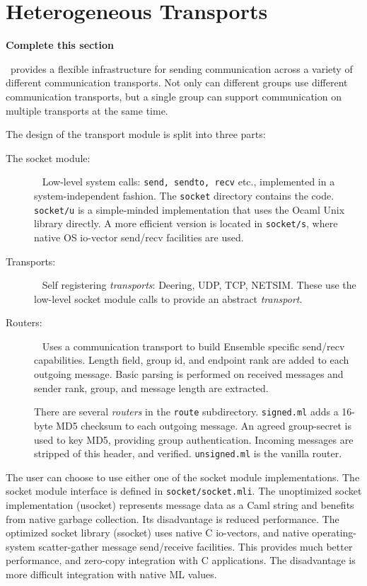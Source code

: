 \newcommand{\sourcefile}[1]    {{\tt {#1}}}


\section{Heterogeneous Transports}

{\bf  Complete this section}

\ensemble\ provides a flexible infrastructure for sending communication
across a variety of different communication transports.  Not only can
different groups use different communication transports, but a single group
can support communication on multiple transports at the same time.

The design of the transport module is split into three parts: 
\begin{description}
\item[The socket module:] ~\newline
   Low-level system calls: {\tt send, sendto, recv} etc.,
  implemented in a system-independent fashion. The {\tt socket}
  directory contains the code. {\tt socket/u} is a simple-minded
  implementation that uses the Ocaml Unix library directly. A more
  efficient version is located in {\tt socket/s}, where native OS
  io-vector send/recv facilities are used. 

\item[Transports:] ~\newline
  Self registering {\it transports}:  Deering, UDP, TCP, NETSIM. These
  use the low-level socket module calls to provide an abstract {\it transport}.
	
\item[Routers:] ~\newline
  Uses a communication transport to
  build Ensemble specific send/recv capabilities. Length field, 
  group id, and endpoint rank are added to each outgoing
  message. Basic parsing is performed on received messages and sender
  rank, group, and message length are extracted. 
 
  There are several {\it routers} in the {\tt route}
  subdirectory. \sourcefile{signed.ml} adds a 16-byte MD5 checksum to
  each outgoing message. An agreed group-secret is used to key MD5,
  providing group authentication. Incoming messages are stripped of
  this header, and verified. \sourcefile{unsigned.ml} is the vanilla router.

\end{description}

The user can choose to use either one of the socket module
implementations. The socket module interface is defined in
\sourcefile{socket/socket.mli}. The unoptimized socket implementation
(usocket) represents message data as a Caml string and benefits from
native garbage collection. Its disadvantage is reduced
performance. The optimized socket library (ssocket) uses native C
io-vectors, and native operating-system scatter-gather message
send/receive facilities. This provides much better performance, and
zero-copy integration with C applications. The disadvantage is more
difficult integration with native ML values. 

